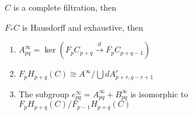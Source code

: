 \documentclass[../main.tex]{subfiles}
\begin{document}
\begin{theorem}
$C$ is a complete filtration, then
\begin{center}
\end{center}
\end{theorem}

\begin{lemma}
$F_*C$ is Hausdorff and exhaustive, then
\begin{enumerate}[label=\arabic*., leftmargin=*]
\item $A^\infty_{pq}=\ker(F_pC_{p+q}\xrightarrow dF_{p}C_{p+q-1})$
\item $F_pH_{p+q}(C)\cong A^\infty/\bigcup dA^r_{p+r,q-r+1}$
\item The subgroup $e^\infty_{pq}=A^\infty_{pq}+B^\infty_{pq}$ is isomorphic to $F_pH_{p+q}(C)/F_{p-1}H_{p+q}(C)$
\end{enumerate}
\end{lemma}
\end{document}
